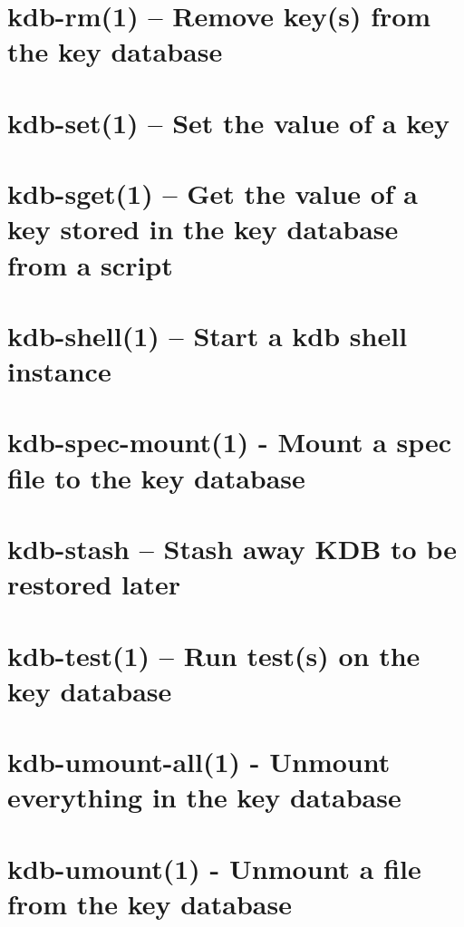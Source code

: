 \let\mypdfximage\pdfximage\def\pdfximage{\immediate\mypdfximage}\documentclass[twoside]{book}
\newcommand{\+}{\discretionary{\mbox{\scriptsize$\hookleftarrow$}}{}{}}
\begin{document}
\chapter{kdb-\/rm(1) -- Remove key(s) from the key database}
\label{doc_help_kdb-rm_md}

\chapter{kdb-\/set(1) -- Set the value of a key}
\label{doc_help_kdb-set_md}

\chapter{kdb-\/sget(1) -- Get the value of a key stored in the key database from a script}
\label{doc_help_kdb-sget_md}

\chapter{kdb-\/shell(1) -- Start a kdb shell instance}
\label{doc_help_kdb-shell_md}

\chapter{kdb-\/spec-\/mount(1) -\/ Mount a spec file to the key database}
\label{doc_help_kdb-spec-mount_md}

\chapter{kdb-\/stash -- Stash away KDB to be restored later}
\label{doc_help_kdb-stash_md}

\chapter{kdb-\/test(1) -- Run test(s) on the key database}
\label{doc_help_kdb-test_md}

\chapter{kdb-\/umount-\/all(1) -\/ Unmount everything in the key database}
\label{doc_help_kdb-umount-all_md}

\chapter{kdb-\/umount(1) -\/ Unmount a file from the key database}
\label{doc_help_kdb-umount_md}

\end{document}
